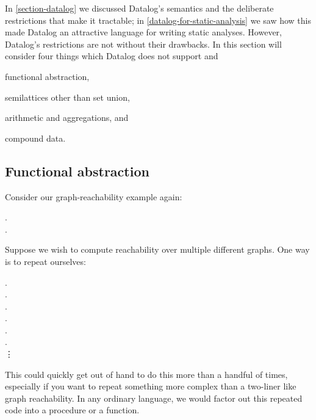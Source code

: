 In \cref{section-datalog} we discussed Datalog's semantics and the deliberate
restrictions that make it tractable; in \cref{datalog-for-static-analysis} we saw how this made Datalog an attractive language for writing static analyses. However, Datalog's restrictions are not without their drawbacks. In this section will consider four things which Datalog does not support and 
\begin{enumerate*}[label=({\arabic*})]
  \item functional abstraction,
  \item semilattices other than set union,
  \item arithmetic and aggregations, and
  \item compound data.
\end{enumerate*}


\subsection{Functional abstraction}

Consider our graph-reachability example again:

\begin{datalog}
  .\\
   \gets {} \conj {}.
\end{datalog}

\noindent
Suppose we wish to compute reachability over multiple different graphs. One way is to repeat ourselves:

\begin{datalog}
  .\\
   \gets {} \conj {}.
  \\[1ex]
  .\\
   \gets {} \conj {}.
  \\[1ex]
  .\\
   \gets {} \conj {}.
  \\
  \qquad\vdots
\end{datalog}

\noindent
This could quickly get out of hand  to do this more
than a handful of times, especially if you want to repeat something more complex
than a two-liner like graph reachability.
%
In any ordinary language, we would factor out this repeated code into a procedure or a function.

